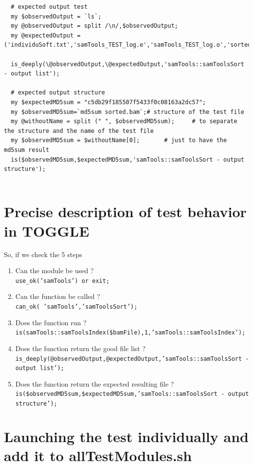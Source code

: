 \documentclass[a4paper,10pt]{report}
\begin{document}
\begin{lstlisting}
  # expected output test
  my $observedOutput = `ls`;
  my @observedOutput = split /\n/,$observedOutput;
  my @expectedOutput = ('individuSoft.txt','samTools_TEST_log.e','samTools_TEST_log.o','sorted.bam','unsorted.bam');

  is_deeply(\@observedOutput,\@expectedOutput,'samTools::samToolsSort - output list');

  # expected output structure
  my $expectedMD5sum = "c5db29f185507f5433f0c08163a2dc57";
  my $observedMD5sum=`md5sum sorted.bam`;# structure of the test file
  my @withoutName = split (" ", $observedMD5sum);     # to separate the structure and the name of the test file
  my $observedMD5sum = $withoutName[0];       # just to have the md5sum result
  is($observedMD5sum,$expectedMD5sum,'samTools::samToolsSort - output structure');
  
\end{lstlisting}

\section{Precise description of test behavior in TOGGLE}

So, if we check the 5 steps

\begin{enumerate}
 \item Can the module be used ? \\
      \texttt{use\_ok('samTools') or exit;}
 \item Can the function be called ? \\
      \texttt{can\_ok( 'samTools','samToolsSort');}
 \item Does the function run ? \\
      \texttt{is(samTools::samToolsIndex(\$bamFile),1,'samTools::samToolsIndex');}
 \item Does the function return the good file list ?\\
      \texttt{is\_deeply(@observedOutput,@expectedOutput,'samTools::samToolsSort - output list');}
 \item Does the function return the expected resulting file ?
      \texttt{is(\$observedMD5sum,\$expectedMD5sum,'samTools::samToolsSort - output structure');}
\end{enumerate}

\section{Launching the test individually and add it to allTestModules.sh}
\end{document}
